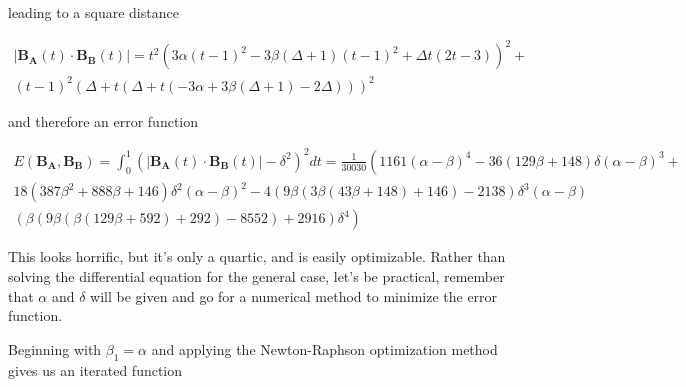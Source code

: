 \documentclass[a4paper]{article}
\newcommand{\norm}[1]{\lvert #1 \rvert}
\begin{document}
leading to a square distance

\begin{multline}\norm{\mathbf{B_A}(t)\cdot\mathbf{B_B}(t)} = 
t^2 \left(3 \alpha  (t-1)^2-3 \beta  (\Delta +1) (t-1)^2+\Delta  t (2 t-3)\right)^2+ \\ (t-1)^2 (\Delta +t (\Delta +t (-3 \alpha +3 \beta  (\Delta +1)-2 \Delta )))^2
\end{multline}

and therefore an error function

\begin{multline}E(\mathbf{B_A},\mathbf{B_B}) = \int_{0}^{1}(\norm{\mathbf{B_A}(t)\cdot\mathbf{B_B}(t)} - \delta^2)^2 dt = \frac{1}{30030}\left(
1161 (\alpha -\beta )^4 - 36 (129 \beta +148) \delta  (\alpha -\beta )^3 + \right. \\
\left. 18 \left(387 \beta ^2+888 \beta +146\right) \delta ^2 (\alpha -\beta )^2 - 4 (9 \beta  (3 \beta  (43 \beta +148)+146)-2138) \delta ^3 (\alpha -\beta ) \right.\\
\left.  (\beta  (9 \beta  (\beta  (129 \beta +592)+292)-8552)+2916) \delta ^4\right)
\end{multline}

This looks horrific, but it's only a quartic, and is easily optimizable. Rather than solving the differential equation for the general case, let's be practical, remember that $\alpha$ and $\delta$ will be given and go for a numerical method to minimize the error function.

Beginning with $\beta_1 = \alpha$ and applying the Newton-Raphson optimization method gives us an iterated function
\end{document}
